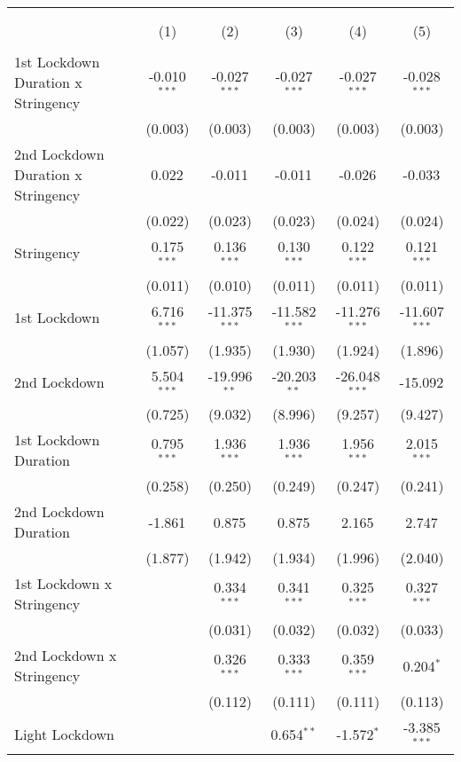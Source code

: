 \begin{tabular}{@{\extracolsep{5pt}}lccccc}
\\[-1.8ex]\hline
\hline \\[-1.8ex]
& \multicolumn{5}{c}{\textit{}} \
\cr \cline{5-6}
\\[-1.8ex] & (1) & (2) & (3) & (4) & (5) \\
\hline \\[-1.8ex]
 1st Lockdown Duration x Stringency & -0.010$^{***}$ & -0.027$^{***}$ & -0.027$^{***}$ & -0.027$^{***}$ & -0.028$^{***}$ \\
  & (0.003) & (0.003) & (0.003) & (0.003) & (0.003) \\
 2nd Lockdown Duration x Stringency & 0.022$^{}$ & -0.011$^{}$ & -0.011$^{}$ & -0.026$^{}$ & -0.033$^{}$ \\
  & (0.022) & (0.023) & (0.023) & (0.024) & (0.024) \\
 Stringency & 0.175$^{***}$ & 0.136$^{***}$ & 0.130$^{***}$ & 0.122$^{***}$ & 0.121$^{***}$ \\
  & (0.011) & (0.010) & (0.011) & (0.011) & (0.011) \\
 1st Lockdown & 6.716$^{***}$ & -11.375$^{***}$ & -11.582$^{***}$ & -11.276$^{***}$ & -11.607$^{***}$ \\
  & (1.057) & (1.935) & (1.930) & (1.924) & (1.896) \\
 2nd Lockdown & 5.504$^{***}$ & -19.996$^{**}$ & -20.203$^{**}$ & -26.048$^{***}$ & -15.092$^{}$ \\
  & (0.725) & (9.032) & (8.996) & (9.257) & (9.427) \\
 1st Lockdown Duration & 0.795$^{***}$ & 1.936$^{***}$ & 1.936$^{***}$ & 1.956$^{***}$ & 2.015$^{***}$ \\
  & (0.258) & (0.250) & (0.249) & (0.247) & (0.241) \\
 2nd Lockdown Duration & -1.861$^{}$ & 0.875$^{}$ & 0.875$^{}$ & 2.165$^{}$ & 2.747$^{}$ \\
  & (1.877) & (1.942) & (1.934) & (1.996) & (2.040) \\
 1st Lockdown x Stringency & & 0.334$^{***}$ & 0.341$^{***}$ & 0.325$^{***}$ & 0.327$^{***}$ \\
  & & (0.031) & (0.032) & (0.032) & (0.033) \\
 2nd Lockdown x Stringency & & 0.326$^{***}$ & 0.333$^{***}$ & 0.359$^{***}$ & 0.204$^{*}$ \\
  & & (0.112) & (0.111) & (0.111) & (0.113) \\
 Light Lockdown & & & 0.654$^{**}$ & -1.572$^{*}$ & -3.385$^{***}$ \\

\end{tabular}
